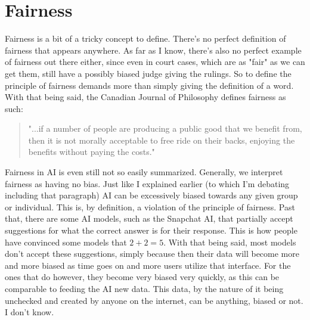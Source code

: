 \documentclass[12pt]{article}
\begin{document}
    \section{Fairness}
    Fairness is a bit of a tricky concept to define. There's no perfect definition of fairness that
    appears anywhere. As far as I know, there's also no perfect example of fairness out there either,
    since even in court cases, which are as "fair" as we can get them, still have a possibly biased
    judge giving the rulings. So to define the principle of fairness demands more than simply giving
    the definition of a word. With that being said, the Canadian Journal of Philosophy defines fairness
    as such:
    \begin{quote}
        "...if a number of people are producing a public good that we benefit from, then it is not
        morally acceptable to free ride on their backs, enjoying the benefits without paying the costs."
    \end{quote}

    Fairness in AI is even still not so easily summarized. Generally, we interpret fairness as having
    no bias. Just like I explained earlier (to which I'm debating including that paragraph) AI can be
    excessively biased towards any given group or individual. This is, by definition, a violation of
    the principle of fairness. Past that, there are some AI models, such as the Snapchat AI, that
    partially accept suggestions for what the correct answer is for their response. This is how people
    have convinced some models that $2+2=5$. With that being said, most models don't accept these
    suggestions, simply because then their data will become more and more biased as time goes on and
    more users utilize that interface. For the ones that do however, they become very biased very
    quickly, as this can be comparable to feeding the AI new data. This data, by the nature of it 
    being unchecked and created by anyone on the internet, can be anything, biased or not. I don't know.
\end{document}
